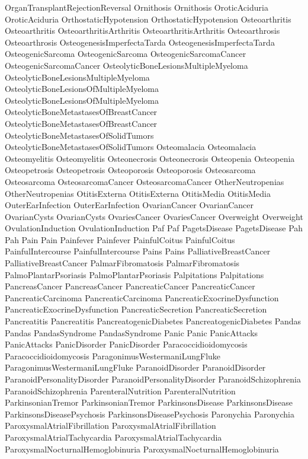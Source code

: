  OrganTransplantRejectionReversal
 Ornithosis
 Ornithosis
 OroticAciduria
 OroticAciduria
 OrthostaticHypotension
 OrthostaticHypotension
 Osteoarthritis
 Osteoarthritis
 OsteoarthritisArthritis
 OsteoarthritisArthritis
 Osteoarthrosis
 Osteoarthrosis
 OsteogenesisImperfectaTarda
 OsteogenesisImperfectaTarda
 OsteogenicSarcoma
 OsteogenicSarcoma
 OsteogenicSarcomaCancer
 OsteogenicSarcomaCancer
 OsteolyticBoneLesionsMultipleMyeloma
 OsteolyticBoneLesionsMultipleMyeloma
 OsteolyticBoneLesionsOfMultipleMyeloma
 OsteolyticBoneLesionsOfMultipleMyeloma
 OsteolyticBoneMetastasesOfBreastCancer
 OsteolyticBoneMetastasesOfBreastCancer
 OsteolyticBoneMetastasesOfSolidTumors
 OsteolyticBoneMetastasesOfSolidTumors
 Osteomalacia
 Osteomalacia
 Osteomyelitis
 Osteomyelitis
 Osteonecrosis
 Osteonecrosis
 Osteopenia
 Osteopenia
 Osteopetrosis
 Osteopetrosis
 Osteoporosis
 Osteoporosis
 Osteosarcoma
 Osteosarcoma
 OsteosarcomaCancer
 OsteosarcomaCancer
 OtherNeutropenias
 OtherNeutropenias
 OtitisExterna
 OtitisExterna
 OtitisMedia
 OtitisMedia
 OuterEarInfection
 OuterEarInfection
 OvarianCancer
 OvarianCancer
 OvarianCysts
 OvarianCysts
 OvariesCancer
 OvariesCancer
 Overweight
 Overweight
 OvulationInduction
 OvulationInduction
 Paf
 Paf
 PagetsDisease
 PagetsDisease
 Pah
 Pah
 Pain
 Pain
 Painfever
 Painfever
 PainfulCoitus
 PainfulCoitus
 PainfulIntercourse
 PainfulIntercourse
 Pains
 Pains
 PalliativeBreastCancer
 PalliativeBreastCancer
 PalmarFibromatosis
 PalmarFibromatosis
 PalmoPlantarPsoriasis
 PalmoPlantarPsoriasis
 Palpitations
 Palpitations
 PancreasCancer
 PancreasCancer
 PancreaticCancer
 PancreaticCancer
 PancreaticCarcinoma
 PancreaticCarcinoma
 PancreaticExocrineDysfunction
 PancreaticExocrineDysfunction
 PancreaticSecretion
 PancreaticSecretion
 Pancreatitis
 Pancreatitis
 PancreatogenicDiabetes
 PancreatogenicDiabetes
 Pandas
 Pandas
 PandasSyndrome
 PandasSyndrome
 Panic
 Panic
 PanicAttacks
 PanicAttacks
 PanicDisorder
 PanicDisorder
 Paracoccidioidomycosis
 Paracoccidioidomycosis
 ParagonimusWestermaniLungFluke
 ParagonimusWestermaniLungFluke
 ParanoidDisorder
 ParanoidDisorder
 ParanoidPersonalityDisorder
 ParanoidPersonalityDisorder
 ParanoidSchizophrenia
 ParanoidSchizophrenia
 ParenteralNutrition
 ParenteralNutrition
 ParkinsonianTremor
 ParkinsonianTremor
 ParkinsonsDisease
 ParkinsonsDisease
 ParkinsonsDiseasePsychosis
 ParkinsonsDiseasePsychosis
 Paronychia
 Paronychia
 ParoxysmalAtrialFibrillation
 ParoxysmalAtrialFibrillation
 ParoxysmalAtrialTachycardia
 ParoxysmalAtrialTachycardia
 ParoxysmalNocturnalHemoglobinuria
 ParoxysmalNocturnalHemoglobinuria
